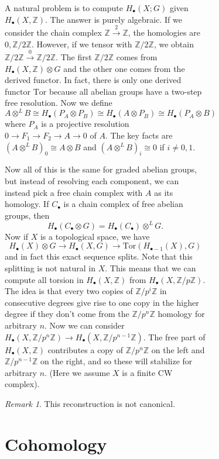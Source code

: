 \documentclass[leqno, openany]{memoir}
\theoremstyle{definition}
\theoremstyle{remark}
\newtheorem{rmk}[thm]{Remark}
\theoremstyle{plain}
\theoremstyle{definition}
\theoremstyle{remark}
\newcommand{\Z}{\mathbb{Z}}
\newcommand{\mr}[1]{\mathrm{#1}}
\begin{document}
\begin{figure}[H]
\begin{figure}[H]
A natural problem is to compute $H_{\bullet}(X;G)$ given $H_{\bullet}(X,\Z)$.
The answer is purely algebraic. If we consider the chain complex $\Z
\xrightarrow{2} \Z$, the homologies are $0, \Z/2\Z$. However, if we tensor with
$\Z/2\Z$, we obtain $\Z/2\Z \xrightarrow{0} \Z/2\Z$. The first $\Z/2\Z$ comes
from $H_{\bullet}(X, \Z) \otimes G$ and the other one comes from the derived
functor. In fact, there is only one derived functor $\mr{Tor}$ because all
abelian groups have a two-step free resolution. Now we define \[ A \otimes^L B
\cong H_{\bullet}(P_A \otimes P_B) \cong H_{\bullet}(A \otimes P_B) \cong
H_{\bullet}(P_A \otimes B) \] where $P_A$ is a projective resolution $0 \to F_1
\to F_2 \to A \to 0$ of $A$. The key facts are $(A \otimes^L B)_0 \cong A
\otimes B$ and $(A \otimes^L B)_i \cong 0$ if $i \neq 0,1$.

Now all of this is the same for graded abelian groups, but instead of resolving
each component, we can instead pick a free chain complex with $A$ as its
homology. If $C_{\bullet}$ is a chain complex of free abelian groups, then \[
H_{\bullet}(C_{\bullet} \otimes G) = H_{\bullet}(C_{\bullet}) \otimes^L G. \]
Now if $X$ is a topological space, we have \[ H_{\bullet}(X) \otimes G \to
H_{\bullet}(X, G) \to \mr{Tor}(H_{\bullet - 1}(X), G) \] and in fact this exact
sequence splits. Note that this splitting is not natural in $X$. This means
that we can compute all torsion in $H_{\bullet}(X, \Z)$ from $H_{\bullet}(X,
\Z/p\Z)$. The idea is that every two copies of $\Z/p^i\Z$ in consecutive
degrees give rise to one copy in the higher degree if they don't come from the
$\Z/p^n\Z$ homology for arbitrary $n$. Now we can consider $H_{\bullet}(X,
\Z/p^n\Z) \to H_{\bullet}(X, \Z/p^{n-1}\Z)$. The free part of $H_{\bullet}(X,
\Z)$ contributes a copy of $\Z/p^n\Z$ on the left and $\Z/p^{n-1}\Z$ on the
right, and so these will stabilize for arbitrary $n$. (Here we assume $X$ is a
finite CW complex). 

\begin{rmk} This reconstruction is not canonical.  \end{rmk}

\chapter{Cohomology}%


\end{figure}
\end{figure}
\end{document}
